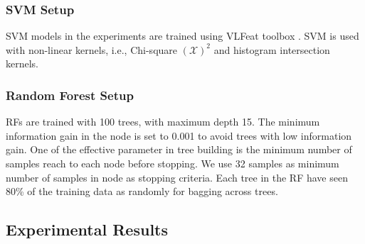 \documentclass[a4paper, 10pt, conference]{ieeeconf}      %
\begin{document}
        
        \subsubsection{SVM Setup}
        \label{section:SVMSetup}
         SVM models in the experiments are trained using VLFeat toolbox \cite{c28}. SVM is used with non-linear kernels, i.e., Chi-square $ \left(\mathcal{X}\right)^{2} $ and histogram intersection kernels. %
        
        \subsubsection{Random Forest Setup}
        \label{section:RandomForestSetup}
        RFs are trained with 100 trees, with maximum depth 15. The minimum information gain in the node is set to 0.001 to avoid trees with low information gain. One of the effective parameter in tree building is the minimum number of samples reach to each node before stopping. We use 32 samples as minimum number of samples in node as stopping criteria. Each tree in the RF have seen 80\% of the training data as randomly for bagging across trees. 


\subsection{Experimental Results}
\label{section:experimentalResults}


    
\end{document}
